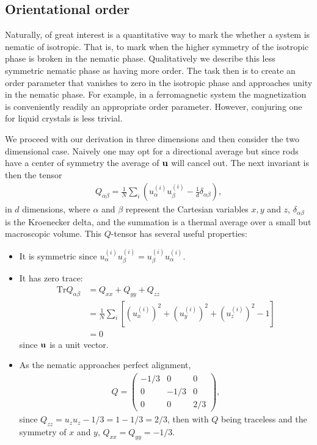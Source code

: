 \subsection{Orientational order}
Naturally, of great interest is a quantitative way to mark the whether a system is nematic of isotropic. That is, to mark when the higher symmetry of the isotropic phase is broken in the nematic phase. Qualitatively we describe this less symmetric nematic phase as having more order. The task then is to create an order parameter that vanishes to zero in the isotropic phase and approaches unity in the nematic phase.
For example, in a ferromagnetic system the magnetization is conveniently readily an appropriate order parameter. However, conjuring one for liquid crystals is less trivial.

We proceed with our derivation in three dimensions and then consider the two dimensional case. Naively one may opt for a directional average but since rods have a center of symmetry the average of $\mathbf{u}$ will cancel out. The next invariant is then the tensor
\begin{align}
	Q_{\alpha\beta} 
	= \frac{1}{N}\sum_i\left(u_\alpha^{(i)}u_\beta^{(i)} - \frac{1}{d}\delta_{\alpha\beta} \right),
\end{align}
in $d$ dimensions, where $\alpha$ and $\beta$ represent the Cartesian variables $x,y$ and $z$, $\delta_{\alpha\beta}$ is the Kroenecker delta, and the summation is a thermal average over a small but macroscopic volume. This $Q$-tensor has several useful properties:
\begin{itemize}
	\item It is symmetric since $u_\alpha^{(i)}u_\beta^{(i)} = 
	u_\beta^{(i)}u_\alpha^{(i)}$.\\
	
	\item It has zero trace:
	\begin{align*}
		\text{Tr}Q_{\alpha\beta} &= Q_{xx}+Q_{yy}+Q_{zz}\\
		&= \frac{1}{N}\sum_i\left[(u_x^{(i)})^2
		+ (u_y^{(i)})^2 + (u_z^{(i)})^2 - 1\right] \\
		&= 0
	\end{align*}
	since $\mathbf{u}$ is a unit vector.\\
	
	\item As the nematic approaches perfect alignment,
	\begin{align*}
		Q = \left(
		\begin{matrix}
		-1/3 & 0 & 0\\
		0 & -1/3 & 0\\
		0 & 0 & 2/3
		\end{matrix}
		\right),
	\end{align*}
	since $Q_{zz} = u_zu_z - 1/3 = 1 - 1/3 = 2/3$, then with $Q$ being traceless and the symmetry of $x$ and $y$, $Q_{xx}=Q_{yy}=-1/3$.\\
\end{itemize} 

